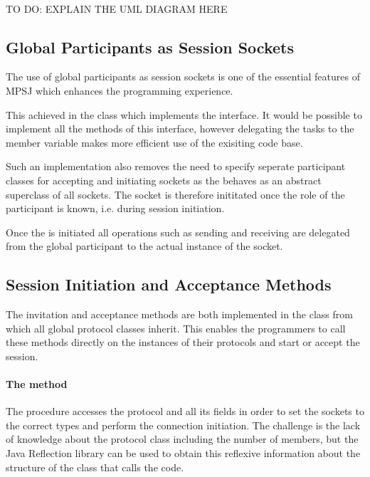 \\ \large{TO DO: EXPLAIN THE UML DIAGRAM HERE}


\subsection{Global Participants as Session Sockets}

The use of global participants as session sockets is one of the essential features of MPSJ which enhances the programming experience.

This achieved in the class  which implements the  interface. It would be possible to implement all the methods of this interface, however delegating the tasks to the  member variable makes more efficient use of the exisiting code base.

Such an implementation also removes the need to specify seperate participant classes for accepting and initiating sockets as the  behaves as an abstract superclass of all sockets. The socket is therefore inititated once the role of the participant is known, i.e. during session initiation.

Once the  is initiated all operations such as sending and receiving are delegated from the global participant to the actual instance of the socket.

\subsection{Session Initiation and Acceptance Methods}

The invitation and acceptance methods are both implemented in the  class from which all global protocol classes inherit. This enables the programmers to call these methods directly on the instances of their protocols and start or accept the session.

\paragraph*{The  method} The procedure accesses the protocol and all its  fields in order to set the sockets to the correct types and perform the connection initiation. The challenge is the lack of knowledge about the protocol class including the number of  members, but the Java Reflection library\cite{javareflect} can be used to obtain this reflexive information about the structure of the class that calls the code. 

